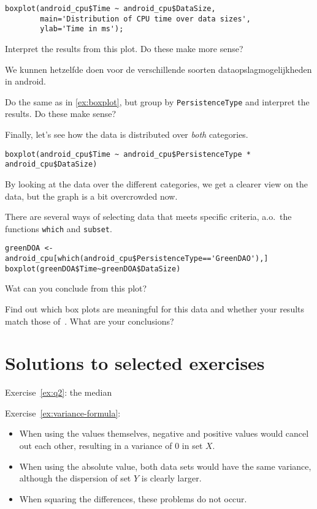 \begin{lstlisting}
boxplot(android_cpu$Time ~ android_cpu$DataSize,
        main='Distribution of CPU time over data sizes',
        ylab='Time in ms');
\end{lstlisting}

\begin{exercise}
\label{ex:boxplot}
Interpret the results from this plot. Do these make more sense?
\end{exercise}

We kunnen hetzelfde doen voor de verschillende soorten dataopslagmogelijkheden in android.

\begin{exercise}
  Do the same as in \ref{ex:boxplot}, but group by \verb|PersistenceType| and interpret the results. Do these make sense?
\end{exercise}

Finally, let's see how the data is distributed over \emph{both} categories.

\begin{lstlisting}
boxplot(android_cpu$Time ~ android_cpu$PersistenceType * android_cpu$DataSize)
\end{lstlisting}

By looking at the data over the different categories, we get a clearer view on the data, but the graph is a bit overcrowded now.

There are several ways of selecting data that meets specific criteria, a.o.~the functions \verb|which| and \verb|subset|.

\begin{lstlisting}
greenDOA <- android_cpu[which(android_cpu$PersistenceType=='GreenDAO'),]
boxplot(greenDOA$Time~greenDOA$DataSize)
\end{lstlisting}

\begin{exercise}
Wat can you conclude from this plot?
\end{exercise}

\begin{exercise}
Find out which box plots are meaningful for this data and whether your results match those of~\textcite{Akin2016}. What are your conclusions?
\end{exercise}



\section{Solutions to selected exercises}

Exercise~\ref{ex:q2}: the median

Exercise~\ref{ex:variance-formula}:

\begin{itemize}
  \item When using the values themselves, negative and positive values would cancel out each other, resulting in a variance of 0 in set $X$.
  \item When using the absolute value, both data sets would have the same variance, although the dispersion of set $Y$ is clearly larger.
  \item When squaring the differences, these problems do not occur.
\end{itemize}
